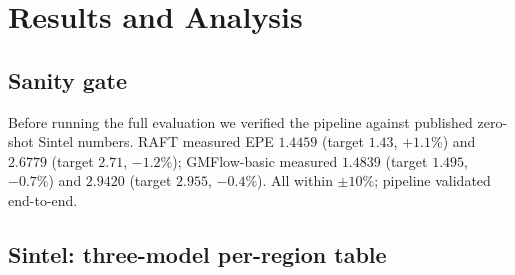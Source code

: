 \documentclass[11pt,a4paper]{article}
\let\origsection\section
\renewcommand{\section}{\FloatBarrier\origsection}
\begin{document}
\section{Results and Analysis}

\subsection{Sanity gate}
Before running the full evaluation we verified the pipeline against
published zero-shot Sintel numbers.  RAFT measured EPE
$1.4459$ (target $1.43$, $+1.1\%$) and $2.6779$ (target $2.71$,
$-1.2\%$); GMFlow-basic measured $1.4839$ (target $1.495$, $-0.7\%$) and
$2.9420$ (target $2.955$, $-0.4\%$).  All within $\pm10\%$; pipeline
validated end-to-end.

\subsection{Sintel: three-model per-region table}
\end{document}

